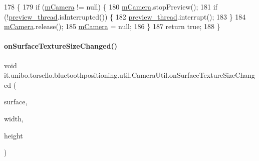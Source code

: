 \begin{DoxyCode}
178                                                                      \{
179         \textcolor{keywordflow}{if} (\hyperlink{classit_1_1unibo_1_1torsello_1_1bluetoothpositioning_1_1util_1_1CameraUtil_ac3d03bd30262a62e27b80e7bab97b40b_ac3d03bd30262a62e27b80e7bab97b40b}{mCamera} != null) \{
180             \hyperlink{classit_1_1unibo_1_1torsello_1_1bluetoothpositioning_1_1util_1_1CameraUtil_ac3d03bd30262a62e27b80e7bab97b40b_ac3d03bd30262a62e27b80e7bab97b40b}{mCamera}.stopPreview();
181             \textcolor{keywordflow}{if} (!\hyperlink{classit_1_1unibo_1_1torsello_1_1bluetoothpositioning_1_1util_1_1CameraUtil_a49f1624f6df81b6a7604b5928c17d443_a49f1624f6df81b6a7604b5928c17d443}{preview\_thread}.isInterrupted()) \{
182                 \hyperlink{classit_1_1unibo_1_1torsello_1_1bluetoothpositioning_1_1util_1_1CameraUtil_a49f1624f6df81b6a7604b5928c17d443_a49f1624f6df81b6a7604b5928c17d443}{preview\_thread}.interrupt();
183             \}
184             \hyperlink{classit_1_1unibo_1_1torsello_1_1bluetoothpositioning_1_1util_1_1CameraUtil_ac3d03bd30262a62e27b80e7bab97b40b_ac3d03bd30262a62e27b80e7bab97b40b}{mCamera}.release();
185             \hyperlink{classit_1_1unibo_1_1torsello_1_1bluetoothpositioning_1_1util_1_1CameraUtil_ac3d03bd30262a62e27b80e7bab97b40b_ac3d03bd30262a62e27b80e7bab97b40b}{mCamera} = null;
186         \}
187         \textcolor{keywordflow}{return} \textcolor{keyword}{true};
188     \}
\end{DoxyCode}
\hypertarget{classit_1_1unibo_1_1torsello_1_1bluetoothpositioning_1_1util_1_1CameraUtil_ae1a6cb9d0f4b5ea28321088152126b79_ae1a6cb9d0f4b5ea28321088152126b79}{}\label{classit_1_1unibo_1_1torsello_1_1bluetoothpositioning_1_1util_1_1CameraUtil_ae1a6cb9d0f4b5ea28321088152126b79_ae1a6cb9d0f4b5ea28321088152126b79} 
\paragraph{\texorpdfstring{on\+Surface\+Texture\+Size\+Changed()}{onSurfaceTextureSizeChanged()}}
{\footnotesize\ttfamily void it.\+unibo.\+torsello.\+bluetoothpositioning.\+util.\+Camera\+Util.\+on\+Surface\+Texture\+Size\+Changed (\begin{DoxyParamCaption}\item[{Surface\+Texture}]{surface,  }\item[{int}]{width,  }\item[{int}]{height }\end{DoxyParamCaption})}



